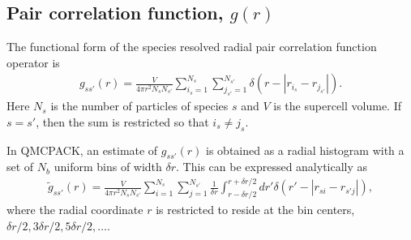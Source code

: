 \subsection{Pair correlation function, $g(r)$}

The functional form of the species resolved radial pair correlation function operator is
\begin{align}
  g_{ss'}(r) = \frac{V}{4\pi r^2N_sN_{s'}}\sum_{i_s=1}^{N_s}\sum_{j_{s'}=1}^{N_{s'}}\delta(r-|r_{i_s}-r_{j_{s'}}|).
\end{align}
Here $N_s$ is the number of particles of species $s$ and $V$ is the supercell volume.  If $s=s'$, then the sum is restricted so that $i_s\ne j_s$.

In QMCPACK, an estimate of $g_{ss'}(r)$ is obtained as a radial histogram with a set of $N_b$ uniform bins of width $\delta r$.  This can be expressed analytically as
\begin{align}
  \tilde{g}_{ss'}(r) = \frac{V}{4\pi r^2N_sN_{s'}}\sum_{i=1}^{N_s}\sum_{j=1}^{N_{s'}}\frac{1}{\delta r}\int_{r-\delta r/2}^{r+\delta r/2}dr'\delta(r'-|r_{si}-r_{s'j}|),
\end{align}
where the radial coordinate $r$ is restricted to reside at the bin centers, $\delta r/2, 3 \delta r/2, 5 \delta r/2, \ldots$.

